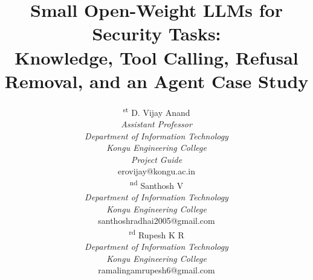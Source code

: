 \documentclass[conference]{IEEEtran}
\begin{document}
\title{Small Open-Weight LLMs for Security Tasks:\\
Knowledge, Tool Calling, Refusal Removal, and an Agent Case Study}

\author{
\begin{minipage}[t]{0.32\textwidth}
\textsuperscript{st} D. Vijay Anand\\
\textit{Assistant Professor}\\
\textit{Department of Information Technology}\\
\textit{Kongu Engineering College}\\
\textit{Project Guide}\\
{\small erovijay@kongu.ac.in}
\end{minipage}%
\hfill
\begin{minipage}[t]{0.32\textwidth}
\textsuperscript{nd} Santhosh V\\
\textit{Department of Information Technology}\\
\textit{Kongu Engineering College}\\
{\small santhoshradhai2005@gmail.com}
\end{minipage}%
\hfill
\begin{minipage}[t]{0.32\textwidth}
\textsuperscript{rd} Rupesh K R\\
\textit{Department of Information Technology}\\
\textit{Kongu Engineering College}\\
{\small ramalingamrupesh6@gmail.com}
\end{minipage}
}

\maketitle
\end{document}
